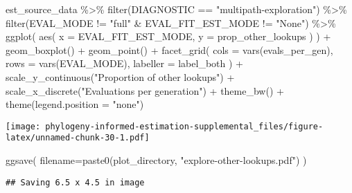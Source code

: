 \documentclass[
]{book}
\newenvironment{Shaded}{\begin{snugshade}}{\end{snugshade}}
\newcommand{\AttributeTok}[1]{\textcolor[rgb]{0.77,0.63,0.00}{#1}}
\newcommand{\FunctionTok}[1]{\textcolor[rgb]{0.00,0.00,0.00}{#1}}
\newcommand{\NormalTok}[1]{#1}
\newcommand{\SpecialCharTok}[1]{\textcolor[rgb]{0.00,0.00,0.00}{#1}}
\newcommand{\StringTok}[1]{\textcolor[rgb]{0.31,0.60,0.02}{#1}}
\begin{document}
\begin{Shaded}
\begin{Highlighting}[]
\NormalTok{est\_source\_data }\SpecialCharTok{\%\textgreater{}\%}
  \FunctionTok{filter}\NormalTok{(DIAGNOSTIC }\SpecialCharTok{==} \StringTok{"multipath{-}exploration"}\NormalTok{) }\SpecialCharTok{\%\textgreater{}\%}
  \FunctionTok{filter}\NormalTok{(EVAL\_MODE }\SpecialCharTok{!=} \StringTok{"full"} \SpecialCharTok{\&}\NormalTok{ EVAL\_FIT\_EST\_MODE }\SpecialCharTok{!=} \StringTok{"None"}\NormalTok{) }\SpecialCharTok{\%\textgreater{}\%}
  \FunctionTok{ggplot}\NormalTok{(}
      \FunctionTok{aes}\NormalTok{(}
        \AttributeTok{x =}\NormalTok{ EVAL\_FIT\_EST\_MODE,}
        \AttributeTok{y =}\NormalTok{ prop\_other\_lookups}
\NormalTok{      )}
\NormalTok{    ) }\SpecialCharTok{+}
    \FunctionTok{geom\_boxplot}\NormalTok{() }\SpecialCharTok{+}
    \FunctionTok{geom\_point}\NormalTok{() }\SpecialCharTok{+}
    \FunctionTok{facet\_grid}\NormalTok{(}
      \AttributeTok{cols =} \FunctionTok{vars}\NormalTok{(evals\_per\_gen),}
      \AttributeTok{rows =} \FunctionTok{vars}\NormalTok{(EVAL\_MODE),}
      \AttributeTok{labeller =}\NormalTok{ label\_both}
\NormalTok{    ) }\SpecialCharTok{+}
    \FunctionTok{scale\_y\_continuous}\NormalTok{(}\StringTok{"Proportion of other lookups"}\NormalTok{) }\SpecialCharTok{+}
    \FunctionTok{scale\_x\_discrete}\NormalTok{(}\StringTok{"Evaluations per generation"}\NormalTok{) }\SpecialCharTok{+}
    \FunctionTok{theme\_bw}\NormalTok{() }\SpecialCharTok{+}
    \FunctionTok{theme}\NormalTok{(}\AttributeTok{legend.position =} \StringTok{"none"}\NormalTok{)}
\end{Highlighting}
\end{Shaded}

\texttt{[image: phylogeny-informed-estimation-supplemental\_files/figure-latex/unnamed-chunk-30-1.pdf]}

\begin{Shaded}
\begin{Highlighting}[]
\FunctionTok{ggsave}\NormalTok{(}
   \AttributeTok{filename=}\FunctionTok{paste0}\NormalTok{(plot\_directory, }\StringTok{"explore{-}other{-}lookups.pdf"}\NormalTok{)}
\NormalTok{)}
\end{Highlighting}
\end{Shaded}

\begin{verbatim}
## Saving 6.5 x 4.5 in image
\end{verbatim}
\end{document}
